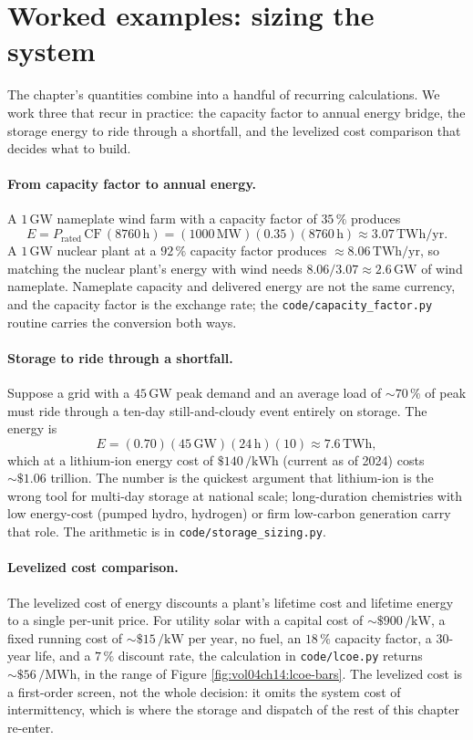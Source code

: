 \section{Worked examples: sizing the system}

The chapter's quantities combine into a handful of recurring
calculations. We work three that recur in practice: the capacity factor
to annual energy bridge, the storage energy to ride through a
shortfall, and the levelized cost comparison that decides what to
build.

\paragraph{From capacity factor to annual energy.} A $1\,\si{\giga
\watt}$ nameplate wind farm with a capacity factor of $35\,\%$ produces
\[
E = P_{\text{rated}}\,\text{CF}\,(8760\,\si{\hour})
  = (1000\,\si{\mega\watt})(0.35)(8760\,\si{\hour})
  \approx 3.07\,\text{TWh}/\text{yr}.
\]
A $1\,\si{\giga\watt}$ nuclear plant at a $92\,\%$ capacity factor
produces $\approx 8.06\,\text{TWh}/\text{yr}$, so matching the nuclear
plant's energy with wind needs $8.06/3.07 \approx 2.6\,\si{\giga\watt}$
of wind nameplate. Nameplate capacity and delivered energy are not the
same currency, and the capacity factor is the exchange rate; the
\texttt{code/capacity\_factor.py} routine carries the conversion both
ways.

\paragraph{Storage to ride through a shortfall.} Suppose a grid with a
$45\,\si{\giga\watt}$ peak demand and an average load of $\sim 70\,\%$
of peak must ride through a ten-day still-and-cloudy event entirely on
storage. The energy is
\[
E = (0.70)(45\,\si{\giga\watt})(24\,\si{\hour})(10) \approx 7.6\,
\text{TWh},
\]
which at a lithium-ion energy cost of $\$140\,\si{\per\kilo\watt\hour}$
(current as of 2024) costs $\sim \$1.06$ trillion. The number is the
quickest argument that lithium-ion is the wrong tool for multi-day
storage at national scale; long-duration chemistries with low
energy-cost (pumped hydro, hydrogen) or firm low-carbon generation
carry that role. The arithmetic is in \texttt{code/storage\_sizing.py}.

\paragraph{Levelized cost comparison.} The levelized cost of energy
discounts a plant's lifetime cost and lifetime energy to a single
per-unit price. For utility solar with a capital cost of $\sim \$900\,
\si{\per\kilo\watt}$, a fixed running cost of $\sim \$15\,\si{\per\kilo
\watt}$ per year, no fuel, an $18\,\%$ capacity factor, a 30-year life,
and a $7\,\%$ discount rate, the calculation in \texttt{code/lcoe.py}
returns $\sim \$56\,\si{\per\mega\watt\hour}$, in the range of Figure
\ref{fig:vol04ch14:lcoe-bars}. The levelized cost is a first-order
screen, not the whole decision: it omits the system cost of
intermittency, which is where the storage and dispatch of the rest of
this chapter re-enter.


